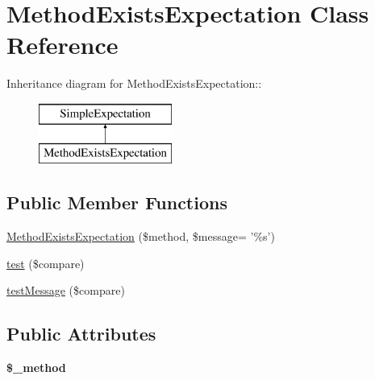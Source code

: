 \hypertarget{class_method_exists_expectation}{
\section{MethodExistsExpectation Class Reference}
\label{class_method_exists_expectation}
}
Inheritance diagram for MethodExistsExpectation::\begin{figure}[H]
\begin{center}
\leavevmode
\includegraphics[height=2cm]{class_method_exists_expectation}
\end{center}
\end{figure}
\subsection*{Public Member Functions}
\begin{DoxyCompactItemize}
\item 
\hyperlink{class_method_exists_expectation_a1fcc8efdc29de2ea492548fa5add2fc2}{MethodExistsExpectation} (\$method, \$message= '\%s')
\item 
\hyperlink{class_method_exists_expectation_a951ee8d86b351ad3b467ea57673526d3}{test} (\$compare)
\item 
\hyperlink{class_method_exists_expectation_a858774c75ad642a628c27a08adb9983b}{testMessage} (\$compare)
\end{DoxyCompactItemize}
\subsection*{Public Attributes}
\begin{DoxyCompactItemize}
\item 
\hypertarget{class_method_exists_expectation_aa1f7fc85685b1475da52f22fc030ad24}{
{\bfseries \$\_\-method}}
\label{class_method_exists_expectation_aa1f7fc85685b1475da52f22fc030ad24}

\end{DoxyCompactItemize}


